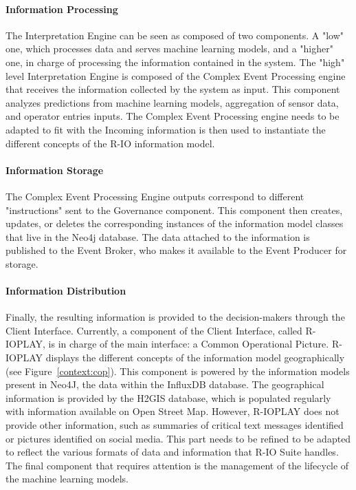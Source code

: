 \paragraph{Information Processing}
The Interpretation Engine can be seen as composed of two components.
A "low" one, which processes data and serves machine learning models, and a "higher" one, in charge of processing the information contained in the system.
The "high" level Interpretation Engine is composed of the Complex Event Processing engine that receives the information collected by the system as input.
This component analyzes predictions from machine learning models, aggregation of sensor data, and operator entries inputs.
The Complex Event Processing engine needs to be adapted to fit with the
Incoming information is then used to instantiate the different concepts of the R-IO information model.
\paragraph{Information Storage}
The Complex Event Processing Engine outputs correspond to different "instructions" sent to the Governance component.
This component then creates, updates, or deletes the corresponding instances of the information model classes that live in the Neo4j database.
The data attached to the information is published to the Event Broker, who makes it available to the Event Producer for storage.
\paragraph{Information Distribution}
Finally, the resulting information is provided to the decision-makers through the Client Interface.
Currently, a component of the Client Interface, called R-IOPLAY, is in charge of the main interface: a Common Operational Picture.
R-IOPLAY displays the different concepts of the information model geographically (see Figure~\ref{context:cop}).
This component is powered by the information models present in Neo4J, the data within the InfluxDB database.
The geographical information is provided by the H2GIS database, which is populated regularly with information available on Open Street Map.
However, R-IOPLAY does not provide other information, such as summaries of critical text messages identified or pictures identified on social media.
This part needs to be refined to be adapted to reflect the various formats of data and information that R-IO Suite handles.
The final component that requires attention is the management of the lifecycle of the machine learning models.

